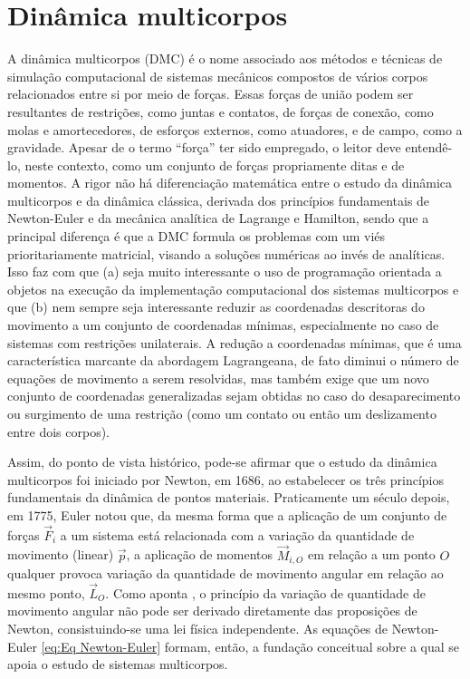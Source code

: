 \section{Dinâmica multicorpos}

A dinâmica multicorpos (DMC) é o nome associado aos métodos e técnicas de simulação computacional de sistemas mecânicos compostos de vários corpos relacionados entre si por meio de forças. Essas forças de união podem ser resultantes de restrições, como juntas e contatos, de forças de conexão, como molas e amortecedores, de esforços externos, como atuadores, e de campo, como a gravidade. Apesar de o termo ``força'' ter sido empregado, o leitor deve entendê-lo, neste contexto, como um conjunto de forças propriamente ditas e de momentos. A rigor não há diferenciação matemática entre o estudo da dinâmica multicorpos e da dinâmica clássica, derivada dos princípios fundamentais de Newton-Euler e da mecânica analítica de Lagrange e Hamilton, sendo que a principal diferença é que a DMC formula os problemas com um viés prioritariamente matricial, visando a soluções numéricas ao invés de analíticas. Isso faz com que (a) seja muito interessante o uso de programação orientada a objetos na execução da implementação computacional dos sistemas multicorpos e que (b) nem sempre seja interessante reduzir as coordenadas descritoras do movimento a um conjunto de coordenadas mínimas, especialmente no caso de sistemas com restrições unilaterais. A redução a coordenadas mínimas, que é uma característica marcante da abordagem Lagrangeana, de fato diminui o número de equações de movimento a serem resolvidas, mas também exige que um novo conjunto de coordenadas generalizadas sejam obtidas no caso do desaparecimento ou surgimento de uma restrição (como um contato ou então um deslizamento entre dois corpos).

Assim, do ponto de vista histórico, pode-se afirmar que o estudo da dinâmica multicorpos foi iniciado por Newton, em 1686, ao estabelecer os três princípios fundamentais da dinâmica de pontos materiais. Praticamente um século depois, em 1775, Euler notou que, da mesma forma que a aplicação de um conjunto de forças $\vec{F}_i$ a um sistema está relacionada com a variação da quantidade de movimento (linear) $\vec{p}$, a aplicação de momentos $\vec{M}_{i,O}$ em relação a um ponto $O$ qualquer provoca variação da quantidade de movimento angular em relação ao mesmo ponto, $\vec{L}_O$. Como aponta , o princípio da variação de quantidade de movimento angular não pode ser derivado diretamente das proposições de Newton, consistuindo-se uma lei física independente. As equações de Newton-Euler \eqref{eq:Eq Newton-Euler} formam, então, a fundação conceitual sobre a qual se apoia o estudo de sistemas multicorpos.

